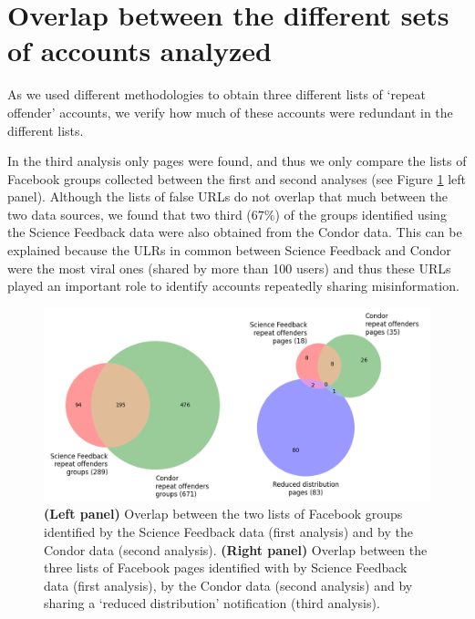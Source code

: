 \documentclass[review]{elsarticle}
\begin{document}
{\section*{Overlap between the different sets of accounts analyzed}

As we used different methodologies to obtain three different lists of `repeat offender' accounts, we verify how much of these accounts were redundant in the different lists. 

In the third analysis only pages were found, and thus we only compare the lists of Facebook groups collected between the first and second analyses (see Figure \ref{venn_accounts} left panel). 
Although the lists of false URLs do not overlap that much between the two data sources, we found that two third ($67\%$) of the groups identified using the Science Feedback data were also obtained from the Condor data. 
This can be explained because the ULRs in common between Science Feedback and Condor were the most viral ones (shared by more than 100 users) and thus these URLs played an important role to identify accounts repeatedly sharing misinformation.

\begin{figure}[!h]
\centering
\includegraphics[scale=0.5]{./../figure/supplementary_venn_groups_and_pages.png}
\caption{
\textbf{(Left panel)} Overlap between the two lists of Facebook groups identified by the Science Feedback data (first analysis) and by the Condor data (second analysis). \textbf{(Right panel)} Overlap between the three lists of Facebook pages identified with by Science Feedback data (first analysis), by the Condor data (second analysis) and by sharing a `reduced distribution' notification (third analysis).
}
\label{venn_accounts}
\end{figure}

}
\end{document}
